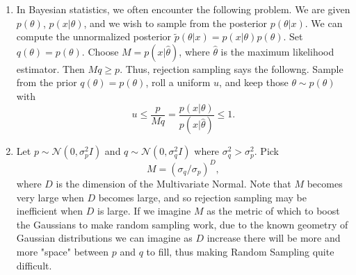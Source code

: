 \documentclass{article}
\begin{document}
\begin{enumerate}
    \item In Bayesian statistics, we often encounter the following problem. We are given $p(\theta)$, $p(x|\theta)$, and we wish to sample from the posterior $p(\theta|x)$. We can compute the unnormalized posterior $\tilde p(\theta|x) = p(x|\theta) p(\theta)$. Set $q(\theta) = p(\theta)$. Choose $M = p(x|\hat \theta)$, where $\hat \theta$ is the maximum likelihood estimator. Then $Mq \ge p$. Thus, rejection sampling says the followng. Sample from the prior $q(\theta) = p(\theta)$, roll a uniform $u$, and keep those $\theta \sim p(\theta)$ with \[u \le \frac{p}{Mq} = \frac{p(x|\theta)}{p(x|\hat \theta)} \le 1.\]
    \item Let $p \sim \mathcal N(0,\sigma_p^2 I)$ and $q \sim \mathcal N(0,\sigma_q^2I)$ where $\sigma_q^2 > \sigma_p^2$. Pick \[
    M = ({\sigma_q/\sigma_p})^D,
    \] 
    where $D$ is the dimension of the Multivariate Normal. Note that $M$ becomes very large when $D$ becomes large, and so rejection sampling may be inefficient when $D$ is large. If we imagine $M$ as the metric of which to boost the Gaussians to make random sampling work, due to the known geometry of Gaussian distributions we can imagine as $D$ increase there will be more and more "space" between $p$ and $q$ to fill, thus making Random Sampling quite difficult. 
\end{enumerate}

    
\end{document}
